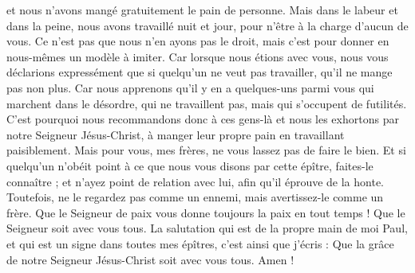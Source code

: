 \begin{multicols}{2}
et nous n'avons mangé gratuitement le pain de personne. Mais dans le labeur et dans la peine, nous avons travaillé nuit et jour, pour n'être à la charge d'aucun de vous.
Ce n'est pas que nous n'en ayons pas le droit, mais c'est pour donner en nous-mêmes un modèle à imiter.
Car lorsque nous étions avec vous, nous vous déclarions expressément que si quelqu'un ne veut pas travailler, qu'il ne mange pas non plus.
Car nous apprenons qu'il y en a quelques-uns parmi vous qui marchent dans le désordre, qui ne travaillent pas, mais qui s'occupent de futilités.
C'est pourquoi nous recommandons donc à ces gens-là et nous les exhortons par notre Seigneur Jésus-Christ, à manger leur propre pain en travaillant paisiblement.
Mais pour vous, mes frères, ne vous lassez pas de faire le bien.
Et si quelqu'un n'obéit point à ce que nous vous disons par cette épître, faites-le connaître ; et n'ayez point de relation avec lui, afin qu'il éprouve de la honte.
Toutefois, ne le regardez pas comme un ennemi, mais avertissez-le comme un frère.
Que le Seigneur de paix vous donne toujours la paix en tout temps ! Que le Seigneur soit avec vous tous.
La salutation qui est de la propre main de moi Paul, et qui est un signe dans toutes mes épîtres, c'est ainsi que j'écris :
Que la grâce de notre Seigneur Jésus-Christ soit avec vous tous. Amen !
\PPE{}
\end{multicols}

